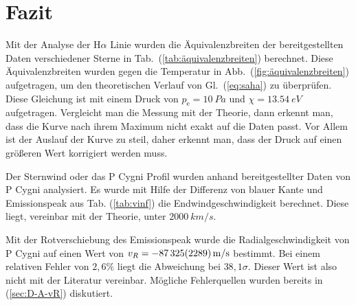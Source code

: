 \section{Fazit}
Mit der Analyse der H$\alpha $ Linie wurden die Äquivalenzbreiten der bereitgestellten Daten verschiedener Sterne in Tab.\ (\ref{tab:äquivalenzbreiten}) berechnet.
Diese Äquivalenzbreiten wurden gegen die Temperatur in Abb.\ (\ref{fig:äquivalenzbreiten}) aufgetragen, um den theoretischen Verlauf von Gl.\ (\ref{eq:saha}) zu überprüfen.
Diese Gleichung ist mit einem Druck von $p_\text{e}=\SI{10}{Pa}$ und $\chi =\SI{13.54}{eV}$ aufgetragen.
Vergleicht man die Messung mit der Theorie, dann erkennt man, dass die Kurve nach ihrem Maximum nicht exakt auf die Daten passt.
Vor Allem ist der Auslauf der Kurve zu steil, daher erkennt man, dass der Druck auf einen größeren Wert korrigiert werden muss.

Der Sternwind oder das P Cygni Profil wurden anhand bereitgestellter Daten von P Cygni analysiert.
Es wurde mit Hilfe der Differenz von blauer Kante und Emissionspeak aus Tab. (\ref{tab:vinf}) die Endwindgeschwindigkeit berechnet.
Diese liegt, vereinbar mit der Theorie, unter $\SI{2000}{km/s}$.

Mit der Rotverschiebung des Emissionspeak wurde die Radialgeschwindigkeit von P Cygni auf einen Wert von $v_R=\SI{-87325+-2289}{m/s}$ bestimmt.
Bei einem relativen Fehler von $2,6\%$ liegt die Abweichung bei $38,1\sigma $.
Dieser Wert ist also nicht mit der Literatur vereinbar.
Mögliche Fehlerquellen wurden bereits in (\ref{sec:D-A-vR}) diskutiert.

